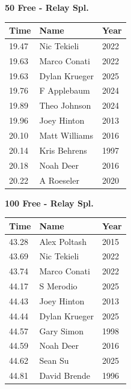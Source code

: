 \vspace{1.2em}
\noindent\begin{minipage}[t]{0.48\textwidth}
\centering
\textbf{\textcolor{teamprimary}{50 Free - Relay Spl.}}\par
\vspace{0.5em}
\centering
\small
\renewcommand{\arraystretch}{1.0}
\setlength{\tabcolsep}{4pt}
\begin{tabular}{@{}p{1.8cm}p{3.0cm}p{1.0cm}@{}}
\toprule
\textbf{Time} & \textbf{Name} & \textbf{Year} \\
\midrule
19.47 & Nic Tekieli & 2022 \\
19.63 & Marco Conati & 2022 \\
19.63 & Dylan Krueger & 2025 \\
19.76 & F Applebaum & 2024 \\
19.89 & Theo Johnson & 2024 \\
19.96 & Joey Hinton & 2013 \\
20.10 & Matt Williams & 2016 \\
20.14 & Kris Behrens & 1997 \\
20.18 & Noah Deer & 2016 \\
20.22 & A Roeseler & 2020 \\
\bottomrule
\end{tabular}
\end{minipage}
\hfill
\begin{minipage}[t]{0.48\textwidth}
\centering
\textbf{\textcolor{teamprimary}{100 Free - Relay Spl.}}\par
\vspace{0.5em}
\centering
\small
\renewcommand{\arraystretch}{1.0}
\setlength{\tabcolsep}{4pt}
\begin{tabular}{@{}p{1.8cm}p{3.0cm}p{1.0cm}@{}}
\toprule
\textbf{Time} & \textbf{Name} & \textbf{Year} \\
\midrule
43.28 & Alex Poltash & 2015 \\
43.69 & Nic Tekieli & 2022 \\
43.74 & Marco Conati & 2022 \\
44.17 & S Merodio & 2025 \\
44.43 & Joey Hinton & 2013 \\
44.44 & Dylan Krueger & 2025 \\
44.57 & Gary Simon & 1998 \\
44.59 & Noah Deer & 2016 \\
44.62 & Sean Su & 2025 \\
44.81 & David Brende & 1996 \\
\bottomrule
\end{tabular}
\end{minipage}
